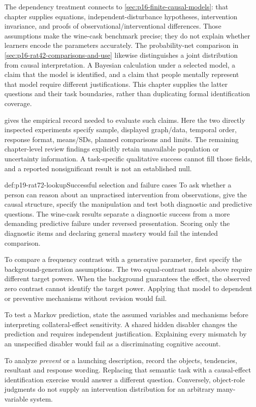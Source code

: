 The dependency treatment connects to
\cref{sec:p16-finite-causal-models}: that chapter supplies equations,
independent-disturbance hypotheses, intervention invariance, and proofs
of observational/interventional differences. Those assumptions make
the wine-cask benchmark precise; they do not explain whether learners
encode the parameters accurately. The probability-net comparison in
\cref{sec:p16-rat42-comparisons-and-use} likewise distinguishes a
joint distribution from causal interpretation. A Bayesian calculation
under a selected model, a claim that the model is identified, and a
claim that people mentally represent that model require different
justifications. This chapter supplies the latter questions and their
task boundaries, rather than duplicating formal identification coverage.

 gives the empirical record needed to
evaluate such claims. Here the two directly inspected experiments
specify sample, displayed graph/data, temporal order, response format,
means/SDs, planned comparisons and limits. The remaining chapter-level
review findings explicitly retain unavailable population or uncertainty
information. A task-specific qualitative success cannot fill those
fields, and a reported nonsignificant result is not an established null.

\begin{hbexample}{def:p19-rat72-lookup}{Successful selection and failure cases}
To ask whether a person can reason about an unpractised intervention
from observations, give the causal structure, specify the manipulation
and test both diagnostic and predictive questions. The wine-cask
results separate a diagnostic success from a more demanding predictive
failure under reversed presentation. Scoring only the diagnostic items
and declaring general mastery would fail the intended comparison.

To compare a frequency contrast with a generative parameter, first
specify the background-generation assumptions. The two equal-contrast
models above require different target powers. When the background
guarantees the effect, the observed zero contrast cannot identify the
target power. Applying that model to dependent or preventive mechanisms
without revision would fail.

To test a Markov prediction, state the assumed variables and mechanisms
before interpreting collateral-effect sensitivity. A shared hidden
disabler changes the prediction and requires independent justification.
Explaining every mismatch by an unspecified disabler would fail as a
discriminating cognitive account.

To analyze \emph{prevent} or a launching description, record the
objects, tendencies, resultant and response wording. Replacing that
semantic task with a causal-effect identification exercise would answer
a different question. Conversely, object-role judgments do not supply
an intervention distribution for an arbitrary many-variable system.
\end{hbexample}

